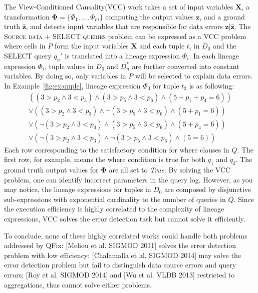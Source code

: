 \documentclass{vldb}
\newcounter{prob}
\newcommand{\sys}{QFix\xspace}
\begin{document}
The View-Conditioned Causality(VCC) work takes a set of input variables $\mathbf{X}$, a transformation $\mathbf{\Phi} =\{\Phi_1, ... , \Phi_m\}$ computing the
output values $\mathbf{z}$, and a ground truth $\hat{\mathbf{z}}$, and detects input variables that are responsible for data errors $\mathbf{z}|\hat{\mathbf{z}}$. 
The \textsc{Source data + SELECT queries} problem can be expressed as a VCC problem where cells in $P$ form the input variables $\mathbf{X}$ and each tuple $t_i$ in $D_0$ and the SELECT query $q_n'$ is translated into a lineage expression $\Phi_i$. In each lineage expression $\Phi_i$, tuple values in $D_0$ and $D_n^*$ are further converted into constant variables. By doing so, only variables in $P$ will be selected to explain data errors. In Example~\ref{fig:example}, lineage expression $\Phi_3$ for tuple $t_3$ is as following:
{\small
\begin{eqnarray*}
&((3 > p_2 \wedge 3 < p_3) \wedge (3 > p_5 \wedge 3 < p_6) \wedge (5 + p_1+p_4 = 6)) &\\
&\vee ((3 > p_2 \wedge 3 < p_3) \wedge \neg(3 > p_5 \wedge 3 < p_6) \wedge (5 + p_1= 6))& \\
&\vee (\neg(3 > p_2 \wedge 3 < p_3) \wedge (3 > p_5 \wedge 3 < p_6) \wedge (5 + p_4= 6))& \\
&\vee (\neg(3 > p_2 \wedge 3 < p_3) \wedge \neg(3 > p_5 \wedge 3 < p_6) \wedge (5 = 6))&
\end{eqnarray*}
}
Each row corresponding to the satisfactory condition for where clauses in $Q$. The first row, for example, means the where condition is true for both $q_1$ and $q_2$. The ground truth output values for $\mathbf{\Phi}$ are all set to \textit{True}. By solving the VCC problem, one can identify incorrect parameters in the query log. However, as you may notice, the lineage expressions for tuples in $D_0$ are composed by disjunctive sub-expressions with exponential cardinality to the number of queries in $Q$. Since the execution efficiency is highly correlated to the complexity of lineage expressions, VCC solves the error detection task but cannot solve it efficiently. 

To conclude, none of these highly correlated works could handle both problems addressed by \sys: [Meliou et al. SIGMOD 2011] solves the error detection problem with low efficiency; [Chalamalla et al. SIGMOD 2014] may solve the error detection problem but fail to distinguish data source errors and query errors; [Roy et al. SIGMOD 2014] and [Wu et al. VLDB 2013] restricted to aggregations, thus cannot solve either problems.
\end{document}
